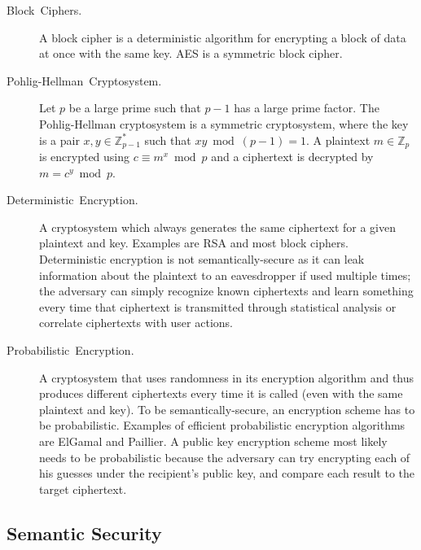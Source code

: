 \documentclass[10pt]{article}
\theoremstyle{plain}
\begin{document}
\begin{description}
	\item [{Block~Ciphers.}] A block cipher is a deterministic algorithm for
	encrypting a block of data at once with the same key. AES is a symmetric
	block cipher.
	\item [{Pohlig-Hellman~Cryptosystem.}] Let $p$ be a large prime such
	that $p-1$ has a large prime factor. The Pohlig-Hellman cryptosystem
	is a symmetric cryptosystem, where the key is a pair $x,y\in\mathbb{Z}_{p-1}^{*}$
	such that $xy\bmod(p-1)=1$. A plaintext $m\in\mathbb{Z}_{p}$ is
	encrypted using $c\equiv m^{x}\bmod p$ and a ciphertext is decrypted
	by $m=c^{y}\bmod p$.
	\item [{Deterministic~Encryption.}] A cryptosystem which always generates
	the same ciphertext for a given plaintext and key. Examples are RSA
	and most block ciphers. Deterministic encryption is not semantically-secure
	as it can leak information about the plaintext to an eavesdropper
	if used multiple times; the adversary can simply recognize known ciphertexts
	and learn something every time that ciphertext is transmitted through
	statistical analysis or correlate ciphertexts with user actions.
	\item [{Probabilistic~Encryption.}] A cryptosystem that uses randomness
	in its encryption algorithm and thus produces different ciphertexts
	every time it is called (even with the same plaintext and key). To
	be semantically-secure, an encryption scheme has to be probabilistic.
	Examples of efficient probabilistic encryption algorithms are ElGamal
	and Paillier. A public key encryption scheme most likely needs to
	be probabilistic because the adversary can try encrypting each of
	his guesses under the recipient's public key, and compare each result
	to the target ciphertext.
\end{description}

\subsection{Semantic Security}
\end{document}
